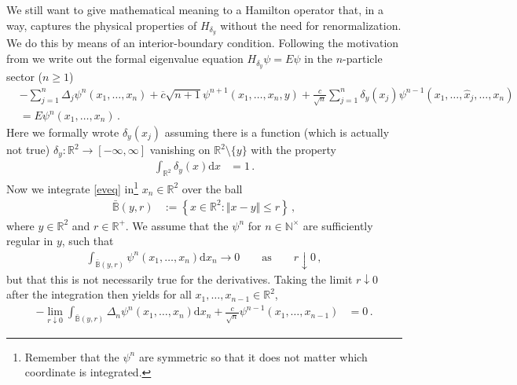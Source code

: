 \nocite{d3d4ed0b}
We still want to give mathematical meaning to a Hamilton operator that, in a way, captures the physical properties of $H_{\delta_{y}}$ without the need for renormalization. We do this by means of an interior-boundary condition. Following the motivation from \cite{3d622ca2} we write out the formal eigenvalue equation $H_{\delta_{y}}\psi = E\psi$ in the $n$-particle sector ($n \geq 1$)
\begin{align}
\label{eveq}
  &
  -
  \sum_{j = 1}^{n}
  \Delta_{j}\psi^{n}
  \left(
    x_{1}
    ,
    \dots
    ,
    x_{n}
  \right)
  +
  \overline{c}
  \sqrt{n + 1}
  \psi^{n + 1}
  \left(
    x_{1}
    ,
    \dots
    ,
    x_{n}
    ,
    y
  \right)
  +
  \frac{c}{\sqrt{n}}
  \sum_{j = 1}^{n}
  \delta_{y}(x_{j})
  \psi^{n - 1}
  \left(
    x_{1}
    ,
    \dots
    ,
    \hat{x}_{j}
    ,
    \dots,x_{n}
  \right)
  \\
  &=
  E
  \psi^{n}
  \left(
    x_{1}
    ,
    \dots
    ,
    x_{n}
  \right)
  \,.
\nonumber
\end{align}
Here we formally wrote $\delta_{y}(x_{j})$ assuming there is a function (which is actually not true) $\delta_{y} \colon \mathbb{R}^{2} \to [-\infty,\infty]$ vanishing on $\mathbb{R}^{2} \setminus \lbrace y \rbrace$ with the property
\begin{align*}
  \int_{\mathbb{R}^{2}}
  \delta_{y}(x)
  \mathrm{d}x
  &=
  1
  \,.
\end{align*}
Now we integrate \eqref{eveq} in\footnote{Remember that the $\psi^{n}$ are symmetric so that it does not matter which coordinate is integrated.} $x_{n} \in \mathbb{R}^{2}$ over the ball
\begin{align*}
  \bar{\mathbb{B}}(y,r)
  &:=
  \left\lbrace
    x
    \in
    \mathbb{R}^{2}
    \colon
    \Vert
      x
      -
      y
    \Vert
    \leq
    r
  \right\rbrace
  \,,
\end{align*}
where $y \in \mathbb{R}^{2}$ and $r \in \mathbb{R}^{+}$. We assume that the $\psi^{n}$ for $n \in \mathbb{N}^{\times}$ are sufficiently regular in $y$, such that
\begin{align*}
  \int_{\bar{\mathbb{B}}(y,r)}
  \psi^{n}
  \left(
    x_{1}
    ,
    \dots
    ,
    x_{n}
  \right)
  \mathrm{d}x_{n}
  \to
  0
  \qquad
  \text{as}
  \qquad
  r
  \downarrow
  0
  \,,
\end{align*}
but that this is not necessarily true for the derivatives. Taking the limit $r \downarrow 0$ after the integration then yields for all $x_{1},\dots,x_{n-1} \in \mathbb{R}^{2}$,
\begin{align}
\label{ibcbase}
  -
  \lim_{r \downarrow 0}
  \int_{\bar{\mathbb{B}}(y,r)}
  \Delta_{n}\psi^{n}
  \left(
    x_{1}
    ,
    \dots
    ,
    x_{n}
  \right)
  \mathrm{d}x_{n}
  +
  \frac{c}{\sqrt{n}}
  \psi^{n-1}
  \left(
    x_{1}
    ,
    \dots
    ,
    x_{n-1}
  \right)
  &=
  0
  \,.
\end{align}
